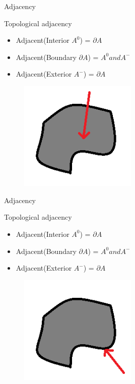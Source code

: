 \begin{frame}{Adjacency}
	\begin{block}{Topological adjacency}
	\begin{itemize}
	\item Adjacent(Interior {$A^0$}) = $\partial A$
	\item Adjacent(Boundary {$\partial A$}) = $A^0 and A^-$
	\item Adjacent(Exterior {$A^-$}) = $\partial A$
	\end{itemize}
	\begin{figure}
	\includegraphics[width = 0.5\textwidth]{images/interior.png}
	\end{figure}
\end{block}		
\end{frame}

\begin{frame}{Adjacency}
	\begin{block}{Topological adjacency}
	\begin{itemize}
	\item Adjacent(Interior {$A^0$}) = $\partial A$
	\item Adjacent(Boundary {$\partial A$}) = $A^0 and A^-$
	\item Adjacent(Exterior {$A^-$}) = $\partial A$
	\end{itemize}
	\begin{figure}
	\includegraphics[width = 0.5\textwidth]{images/boundary.png}
	\end{figure}
\end{block}		
\end{frame}

